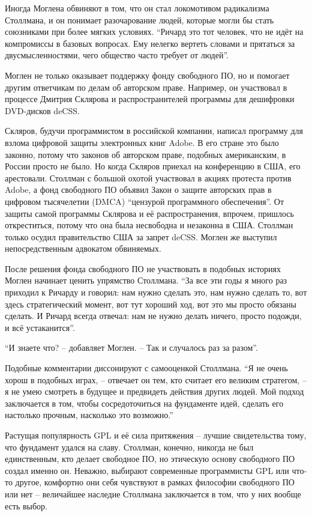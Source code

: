 Иногда Моглена обвиняют в том, что он стал локомотивом радикализма Столлмана, и он понимает разочарование людей, которые могли бы стать союзниками при более мягких условиях. \enquote{Ричард это тот человек, что не идёт на компромиссы в базовых вопросах. Ему нелегко вертеть словами и прятаться за двусмысленностями, чего общество часто требует от людей}.

Моглен не только оказывает поддержку фонду свободного ПО, но и помогает другим ответчикам по делам об авторском праве. Например, он участвовал в процессе Дмитрия Склярова и распространителей программы для дешифровки DVD-дисков deCSS.

Скляров, будучи программистом в российской компании, написал программу для взлома цифровой защиты электронных книг Adobe. В его стране это было законно, потому что законов об авторском праве, подобных американским, в России просто не было. Но когда Скляров приехал на конференцию в США, его арестовали. Столлман с большой охотой участвовал в акциях протеста против Adobe, а фонд свободного ПО объявил Закон о защите авторских прав в цифровом тысячелетии (DMCA) \enquote{цензурой программного обеспечения}. От защиты самой программы Склярова и её распространения, впрочем, пришлось откреститься, потому что она была несвободна и незаконна в США. Столлман только осудил правительство США за запрет deCSS. Моглен же выступил непосредственным адвокатом обвиняемых.

После решения фонда свободного ПО не участвовать в подобных историях Моглен начинает ценить упрямство Столлмана. \enquote{За все эти годы я много раз приходил к Ричарду и говорил: нам нужно сделать это, нам нужно сделать то, вот здесь стратегический момент, вот тут хороший ход, вот это мы просто обязаны сделать. И Ричард всегда отвечал: нам не нужно делать ничего, просто подожди, и всё устаканится}.

\enquote{И знаете что? -- добавляет Моглен. -- Так и случалось раз за разом}.

Подобные комментарии диссонируют с самооценкой Столлмана. \enquote{Я не очень хорош в подобных играх, -- отвечает он тем, кто считает его великим стратегом, -- я не умею смотреть в будущее и предвидеть действия других людей. Мой подход заключается в том, чтобы сосредоточиться на фундаменте идей, сделать его настолько прочным, насколько это возможно.\hspace{0.01in}}

Растущая популярность GPL и её сила притяжения -- лучшие свидетельства тому, что фундамент удался на славу. Столлман, конечно, никогда не был единственным, кто делает свободное ПО, но этическую основу свободного ПО создал именно он. Неважно, выбирают современные программисты GPL или что-то другое, комфортно они себя чувствуют в рамках философии свободного ПО или нет -- величайшее наследие Столлмана заключается в том, что у них вообще есть выбор.

